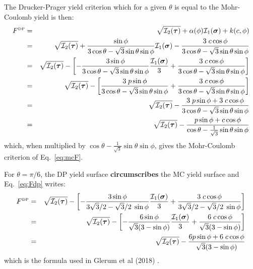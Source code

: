 The Drucker-Prager yield criterion which for a given $\theta$ is equal to the Mohr-Coulomb yield is then:
\begin{eqnarray}
F^{\text{\tiny DP}}
&=& \sqrt{{\cal I}_2({\bm \tau})} + \alpha(\phi) {\cal I}_1({\bm \sigma}) + k(c,\phi)  \nonumber\\
&=& \sqrt{{\cal I}_2({\bm \tau})} 
+ \frac{\sin\phi}{ 3 \cos\theta - \sqrt{3}\sin\theta \sin\phi}  {\cal I}_1({\bm \sigma})  
- \frac{ 3\; c \cos \phi }{ 3 \cos\theta - \sqrt{3}\sin\theta \sin\phi} \nonumber\\
&=& \sqrt{{\cal I}_2({\bm \tau})} 
- \left[ -\frac{3 \sin\phi}{ 3 \cos\theta - \sqrt{3}\sin\theta \sin\phi}  \frac{{\cal I}_1({\bm \sigma})}{3}
+ \frac{ 3\; c \cos \phi }{ 3 \cos\theta - \sqrt{3}\sin\theta \sin\phi} \right] \label{eq:Fdp}\\
&=& \sqrt{{\cal I}_2({\bm \tau})} 
- \left[ \frac{3\; p \sin\phi}{ 3 \cos\theta - \sqrt{3}\sin\theta \sin\phi} 
+ \frac{ 3\; c \cos \phi }{ 3 \cos\theta - \sqrt{3}\sin\theta \sin\phi} \right] \nonumber\\
&=& \sqrt{{\cal I}_2({\bm \tau})}  
- \frac{3\; p \sin\phi  + 3\; c \cos \phi }{ 3 \cos\theta - \sqrt{3}\sin\theta \sin\phi} \nonumber\\ 
&=& \sqrt{{\cal I}_2({\bm \tau})}  
- \frac{p \sin\phi  + c \cos \phi }{  \cos\theta - \frac{1}{\sqrt{3}}\sin\theta \sin\phi} 
\end{eqnarray}
which, when multiplied by $\cos\theta - \frac{1}{\sqrt{3}}\sin\theta \sin\phi$, gives
the Mohr-Coulomb criterion of Eq.~\eqref{eq:mcF}. 

For $\theta=\pi/6$, the DP yield surface {\bf circumscribes} the MC yield 
surface and Eq.~\eqref{eq:Fdp} writes:
\begin{eqnarray}
F^{\text{\tiny DP}}
&=& \sqrt{{\cal I}_2({\bm \tau})} 
- \left[ -\frac{3 \sin\phi}{ 3 \sqrt{3}/2 - \sqrt{3}/2 \; \sin\phi}  \frac{{\cal I}_1({\bm \sigma})}{3}
+ \frac{ 3\; c \cos \phi }{ 3 \sqrt{3}/2 - \sqrt{3}/2 \; \sin\phi} \right] \nonumber\\
&=& \sqrt{{\cal I}_2({\bm \tau})} 
- \left[ -\frac{6 \sin\phi}{\sqrt{3} (3 - \sin\phi) }  \frac{{\cal I}_1({\bm \sigma})}{3}
+ \frac{ 6\; c \cos \phi }{ \sqrt{3}(3 - \sin\phi)} \right] \nonumber\\
&=& \sqrt{{\cal I}_2({\bm \tau})} 
- \frac{ 6 p \sin \phi + 6\; c \cos \phi }{ \sqrt{3}(3 - \sin\phi)} \label{eq:dpc}
\end{eqnarray}
which is the formula used in Glerum et al (2018) \cite{gltf18}.

